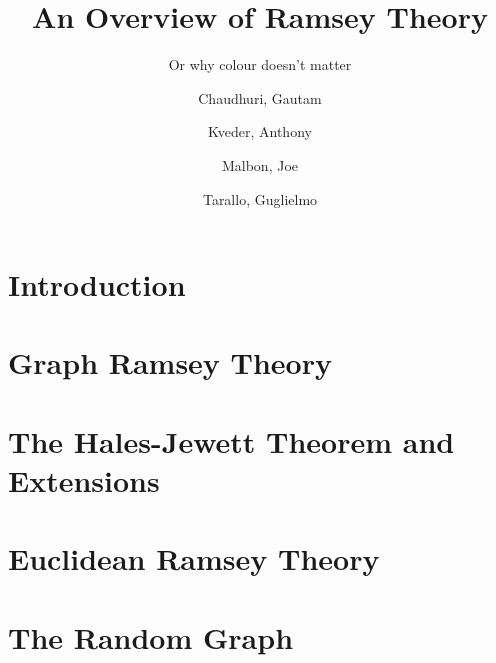 \documentclass{beamer}
\author{
  Chaudhuri, Gautam\\
  \and
  Kveder, Anthony\\
  \and
  Malbon, Joe\\
  \and
  Tarallo, Guglielmo\\
}
\title{An Overview of Ramsey Theory}
\subtitle{Or why colour doesn't matter}
\theoremstyle{BreakBold}
\begin{document}
\frame{\titlepage}

\section{Introduction}


\section{Graph Ramsey Theory}


\section{The Hales-Jewett Theorem and Extensions}


\section{Euclidean Ramsey Theory}


\section{The Random Graph}

\end{document}
